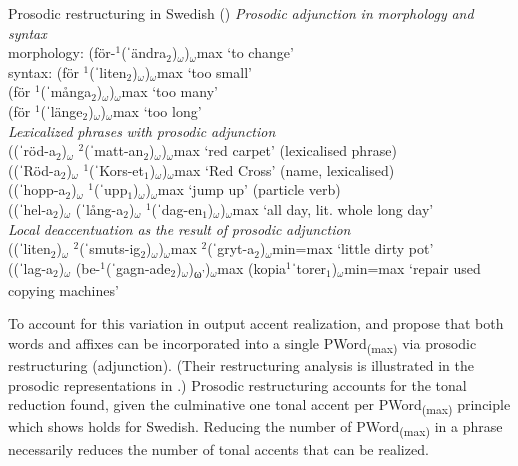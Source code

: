\documentclass[output=paper]{langscibook}
\begin{document}
\ea  Prosodic restructuring in Swedish (\citealt{Myrberg2015}) \label{ex:downing:17}
\ea  \textit{Prosodic} \textit{adjunction} \textit{in} \textit{morphology} \textit{and} \textit{syntax} \label{ex:downing:17a}\\

  morphology:  (för-$^1$(ˈändra$_2$)$_ω$)$_ω$max   ‘to change’ \\

  syntax:  (för $^1$(ˈliten$_2$)$_ω$)$_ω$max  ‘too small’\\

      (för $^1$(ˈmånga$_2$)$_ω$)$_ω$max  ‘too many’\\

      (för $^1$(ˈlänge$_2$)$_ω$)$_ω$max  ‘too long’\\

\ex   \textit{Lexicalized} \textit{phrases} \textit{with} \textit{prosodic} \textit{adjunction}\label{ex:downing:17b}\\

((ˈröd-a$_2$)$_ω$ $^2$(ˈmatt-an$_2$)$_ω$)$_ω$max  ‘red carpet’ (lexicalised phrase)\\

((ˈRöd-a$_2$)$_ω$ $^1$(ˈKors-et$_1$)$_ω$)$_ω$max   ‘Red Cross’ (name, lexicalised)\\

((ˈhopp-a$_2$)$_ω$ $^1$(ˈupp$_1$)$_ω$)$_ω$max  ‘jump up’  (particle verb)\\

((ˈhel-a$_2$)$_ω$ (ˈlång-a$_2$)$_ω$ $^1$(ˈdag-en$_1$)$_ω$)$_ω$max ‘all day, lit. whole long day’\\

\ex   \textit{Local} \textit{deaccentuation} \textit{as} \textit{the} \textit{result} \textit{of} \textit{prosodic} \textit{adjunction}\label{ex:downing:17c}\\

((ˈliten$_2$)$_ω$ $^2$(ˈsmuts-ig$_2$)$_ω$)$_ω$max $^2$(ˈgryt-a$_2$)$_ω$min=max  ‘little dirty pot’\\
                                                                                                                                       
((ˈlag-a$_2$)$_ω$ (be-$^1$(ˈgagn-ade$_2$)$_ω$)\textsubscript{ω’})$_ω$max (kopia$^1$ˈtorer$_1$)$_ω$min=max ‘repair used copying machines’\\
\z
\z     

{To account for this variation in output accent realization, \citet{Myrberg2015} and \citet{Riad2016} propose that both words and affixes can be incorporated into a single PWord\textsubscript{(max)} via prosodic restructuring (adjunction). (Their restructuring analysis is illustrated in the prosodic representations in .) Prosodic restructuring accounts for the tonal reduction found, given the culminative one tonal accent per PWord\textsubscript{(max)} principle which \citet{Riad2016} shows holds for Swedish. Reducing the number of PWord\textsubscript{(max)} in a phrase necessarily reduces the number of tonal accents that can be realized.}\\
\end{document}
